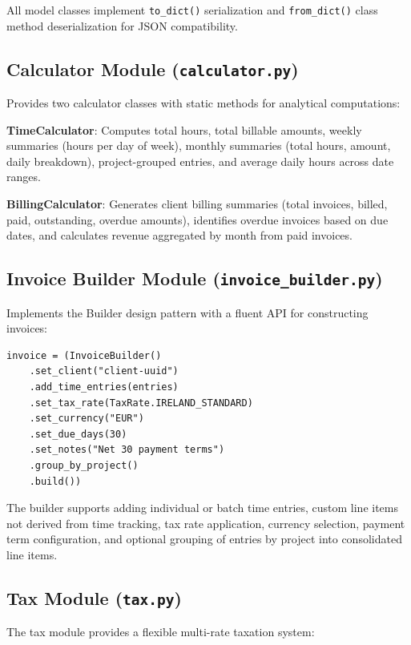 \documentclass[conference]{IEEEtran}
\begin{document}
All model classes implement \texttt{to\_dict()} serialization and \texttt{from\_dict()} class method deserialization for JSON compatibility.

\subsection{Calculator Module (\texttt{calculator.py})}

Provides two calculator classes with static methods for analytical computations:

\textbf{TimeCalculator}: Computes total hours, total billable amounts, weekly summaries (hours per day of week), monthly summaries (total hours, amount, daily breakdown), project-grouped entries, and average daily hours across date ranges.

\textbf{BillingCalculator}: Generates client billing summaries (total invoices, billed, paid, outstanding, overdue amounts), identifies overdue invoices based on due dates, and calculates revenue aggregated by month from paid invoices.

\subsection{Invoice Builder Module (\texttt{invoice\_builder.py})}

Implements the Builder design pattern with a fluent API for constructing invoices:

\begin{lstlisting}[caption={InvoiceBuilder fluent API usage},label=lst:builder]
invoice = (InvoiceBuilder()
    .set_client("client-uuid")
    .add_time_entries(entries)
    .set_tax_rate(TaxRate.IRELAND_STANDARD)
    .set_currency("EUR")
    .set_due_days(30)
    .set_notes("Net 30 payment terms")
    .group_by_project()
    .build())
\end{lstlisting}

The builder supports adding individual or batch time entries, custom line items not derived from time tracking, tax rate application, currency selection, payment term configuration, and optional grouping of entries by project into consolidated line items.

\subsection{Tax Module (\texttt{tax.py})}

The tax module provides a flexible multi-rate taxation system:
\end{document}
